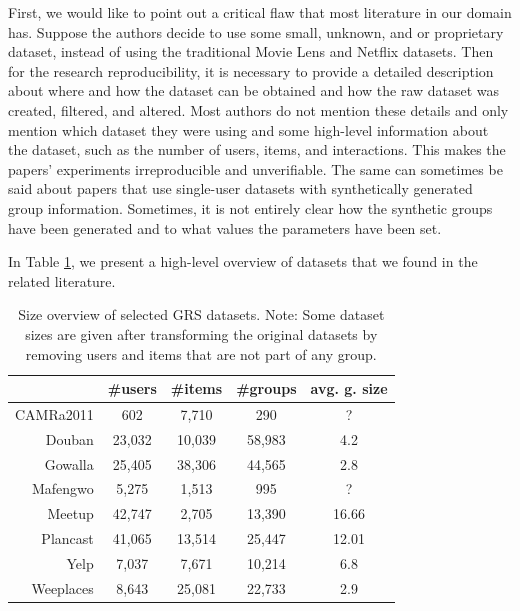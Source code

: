 First, we would like to point out a critical flaw that most literature in our domain has. Suppose the authors decide to use some small, unknown, and or proprietary dataset, instead of using the traditional Movie Lens and Netflix datasets. Then for the research reproducibility, it is necessary to provide a detailed description about where and how the dataset can be obtained and how the raw dataset was created, filtered, and altered. Most authors do not mention these details and only mention which dataset they were using and some high-level information about the dataset, such as the number of users, items, and interactions. This makes the papers' experiments irreproducible and unverifiable. The same can sometimes be said about papers that use single-user datasets with synthetically generated group information. Sometimes, it is not entirely clear how the synthetic groups have been generated and to what values the parameters have been set.

In Table \ref{table:5.2_GRS_datasets_comparation}, we present a high-level overview of datasets that we found in the related literature.

\begin{table}[!ht]
    \centering
    \begin{tabular}{ r | c c c c }
         & \#users & \#items & \#groups & avg. g. size \\
        \hline
            CAMRa2011\cite{attentative_group_recommendation}
                & 602 & 7,710 & 290 & ? \\
            Douban\cite{gowalla_weeplaces_yelp}
                & 23,032 & 10,039 & 58,983 & 4.2 \\
            Gowalla\cite{gowalla_weeplaces_yelp}
                & 25,405 &  38,306 & 44,565 &  2.8 \\
            Mafengwo\cite{attentative_group_recommendation}
                & 5,275 & 1,513 & 995 & ? \\
            Meetup\cite{meetup_origin}
                & 42,747 & 2,705 & 13,390 & 16.66 \\
            Plancast\cite{meetup_plancast}
                & 41,065 & 13,514 & 25,447 & 12.01 \\
            Yelp\cite{gowalla_weeplaces_yelp}
                & 7,037 & 7,671 & 10,214 & 6.8 \\
            Weeplaces\cite{gowalla_weeplaces_yelp}
                &  8,643 & 25,081 & 22,733 & 2.9 \\
    \end{tabular}
    \caption[Size overview of selected GRS datasets]{Size overview of selected GRS datasets. Note: Some dataset sizes are given after transforming the original datasets by removing users and items that are not part of any group.}
    \label{table:5.2_GRS_datasets_comparation}
\end{table}


